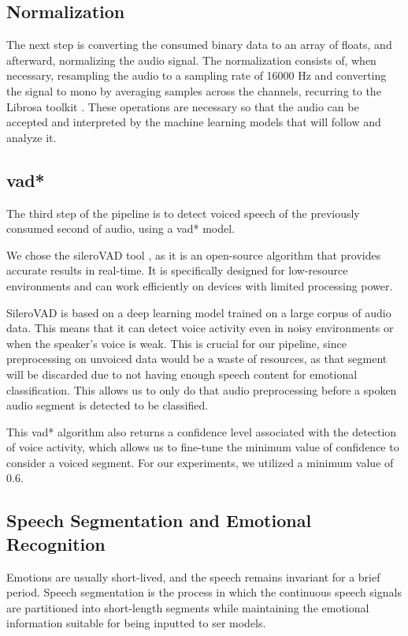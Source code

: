 \subsection{Normalization}

The next step is converting the consumed binary data to an array of floats, and afterward, normalizing the audio signal. The normalization consists of, when necessary, resampling the audio to a sampling rate of 16000 Hz and converting the signal to mono by averaging samples across the channels, recurring to the Librosa toolkit \cite{Librosa}. These operations are necessary so that the audio can be accepted and interpreted by the machine learning models that will follow and analyze it.

\subsection{\acl{vad*}}

The third step of the pipeline is to detect voiced speech of the previously consumed second of audio, using a \ac{vad*} model.

We chose the sileroVAD tool \cite{SileroVAD}, as it is an open-source algorithm that provides accurate results in real-time. It is specifically designed for low-resource environments and can work efficiently on devices with limited processing power.

SileroVAD is based on a deep learning model trained on a large corpus of audio data. This means that it can detect voice activity even in noisy environments or when the speaker's voice is weak. This is crucial for our pipeline, since preprocessing on unvoiced data would be a waste of resources, as that segment will be discarded due to not having enough speech content for emotional classification. This allows us to only do that audio preprocessing before a spoken audio segment is detected to be classified.

This \ac{vad*} algorithm also returns a confidence level associated with the detection of voice activity, which allows us to fine-tune the minimum value of confidence to consider a voiced segment. For our experiments, we utilized a minimum value of 0.6.

\subsection{Speech Segmentation and Emotional Recognition}

Emotions are usually short-lived, and the speech remains invariant for a brief period. Speech segmentation is the process in which the continuous speech signals are partitioned into short-length segments while maintaining the emotional information suitable for being inputted to \ac{ser} models.


